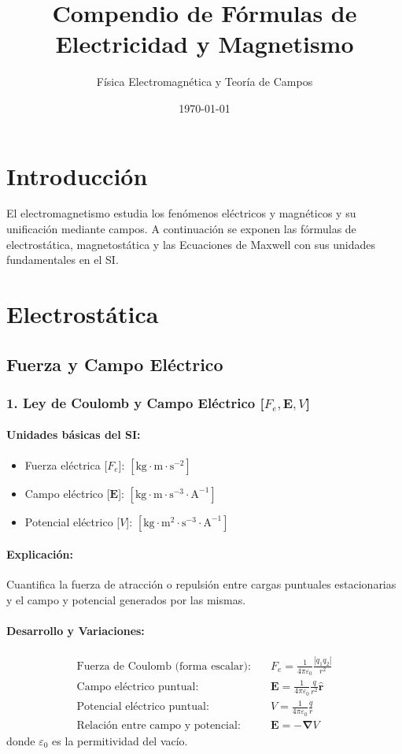 \documentclass[12pt,a4paper]{article}
\title{\textbf{Compendio de Fórmulas de Electricidad y Magnetismo}}
\author{Física Electromagnética y Teoría de Campos}
\date{\today}
\begin{document}
\maketitle

\section*{Introducción}
El electromagnetismo estudia los fenómenos eléctricos y magnéticos y su unificación mediante campos. A continuación se exponen las fórmulas de electrostática, magnetostática y las Ecuaciones de Maxwell con sus unidades fundamentales en el SI.

\section{Electrostática}

\subsection{Fuerza y Campo Eléctrico}

\subsubsection*{1. Ley de Coulomb y Campo Eléctrico [$F_e, \mathbf{E}, V$]}
\paragraph*{Unidades básicas del SI:}
\begin{itemize}
    \item Fuerza eléctrica [$F_e$]: $[\text{kg}\cdot\text{m}\cdot\text{s}^{-2}]$
    \item Campo eléctrico [$\mathbf{E}$]: $[\text{kg}\cdot\text{m}\cdot\text{s}^{-3}\cdot\text{A}^{-1}]$
    \item Potencial eléctrico [$V$]: $[\text{kg}\cdot\text{m}^2\cdot\text{s}^{-3}\cdot\text{A}^{-1}]$
\end{itemize}
\paragraph*{Explicación:} Cuantifica la fuerza de atracción o repulsión entre cargas puntuales estacionarias y el campo y potencial generados por las mismas.
\paragraph*{Desarrollo y Variaciones:}
\begin{align*}
\text{Fuerza de Coulomb (forma escalar):} \quad & F_e = \frac{1}{4\pi\varepsilon_0} \frac{|q_1 q_2|}{r^2} \\
\text{Campo eléctrico puntual:} \quad & \mathbf{E} = \frac{1}{4\pi\varepsilon_0} \frac{q}{r^2} \hat{\mathbf{r}} \\
\text{Potencial eléctrico puntual:} \quad & V = \frac{1}{4\pi\varepsilon_0} \frac{q}{r} \\
\text{Relación entre campo y potencial:} \quad & \mathbf{E} = -\boldsymbol{\nabla} V
\end{align*}
donde $\varepsilon_0$ es la permitividad del vacío.
\end{document}
